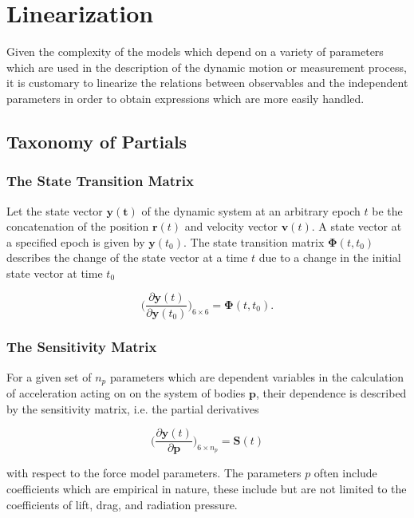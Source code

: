 \section{Linearization}

Given the complexity of the models which depend on a variety of
parameters which are used in the description of the dynamic motion or
measurement process, it is customary to linearize the relations between
observables and the independent parameters in order to obtain expressions which
are more easily handled.

\subsection{Taxonomy of Partials}
\subsubsection{The State Transition Matrix}

Let the state vector $\mathbf{y(t)}$ of the dynamic system at an arbitrary epoch
$t$ be the concatenation of the position $\mathbf{r}(t)$ and velocity vector
$\mathbf{v}(t)$. A state vector at a specified epoch is given by
$\mathbf{y}(t_0)$. The state transition matrix $\bm{\Phi}(t,t_0)$ describes the
change of the state vector at a time $t$ due to a change in the initial state
vector at time $t_0$

\begin{equation}
    \bigg(\frac{\partial\mathbf{y}(t)}{\partial{\mathbf{y}(t_0)}}\bigg)_{6\times{6}}=\bm{\Phi}(t, t_0).
    \label{eq:linear_stm}
\end{equation}

\subsubsection{The Sensitivity Matrix}

For a given set of $n_p$ parameters which are dependent variables in
the calculation of acceleration acting on on the system of bodies $\mathbf{p}$,
their dependence is described by the sensitivity matrix, i.e. the partial
derivatives

\begin{equation}
    \bigg(\frac{\partial\mathbf{y}(t)}{\partial{\mathbf{p}}}\bigg)_{6\times{n_p}}=\bm{S}(t)
\end{equation}

with respect to the force model parameters. The parameters $p$ often include
coefficients which are empirical in nature, these include but are not limited to
the coefficients of lift, drag, and radiation pressure.

